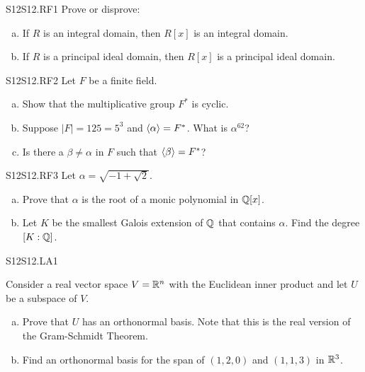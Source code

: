 \documentclass[../AlgebraQualSolutions.tex]{subfiles}
\begin{document}
	\begin{prob}{S12}{S12.RF1}
		Prove or disprove:

		\begin{enumerate}[(a)]
			\item If $R$ is an integral domain, then $R[x]$ is an integral domain.
			\item If $R$ is a principal ideal domain, then $R[x]$ is a principal ideal domain.
		\end{enumerate}
	\end{prob}

	\begin{prob}{S12}{S12.RF2}
		Let $F$ be a finite field.

		\begin{enumerate}[(a)]
			\item Show that the multiplicative group $F^*$ is cyclic.
			\item Suppose $|F| = 125 = 5^3$ and $\langle \alpha \rangle = F^*$. What is $\alpha^{62}$?
			\item Is there a $\beta \neq \alpha$ in $F$ such that $\langle \beta \rangle = F^*$?
		\end{enumerate}
	\end{prob}

	\begin{prob}{S12}{S12.RF3}
		Let $\alpha = \sqrt{-1+\sqrt{2}}$.
		\begin{enumerate}[(a)]
			\item Prove that $\alpha$ is the root of a monic polynomial in $\mathbb{Q}[x]$.
			\item Let $K$ be the smallest Galois extension of $\mathbb{Q}$ that contains $\alpha$. Find the degree $[K: \mathbb{Q}]$.
		\end{enumerate}
	\end{prob}

	\begin{prob}{S12}{S12.LA1}

		Consider a real vector space $V = \mathbb{R}^n$ with the Euclidean inner product and let $U$ be a subspace of $V$.

		\begin{enumerate}[(a)]
			\item Prove that $U$ has an orthonormal basis. Note that this is the real version of the Gram-Schmidt Theorem.
			\item Find an orthonormal basis for the span of $(1,2,0)$ and $(1,1,3)$ in $\mathbb{R}^3$.
		\end{enumerate}
	\end{prob}
\end{document}
